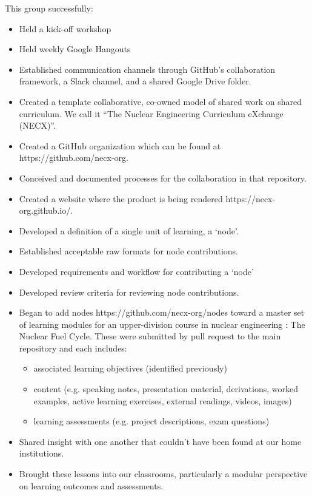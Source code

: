 \documentclass[11pt]{article}
\begin{document}
          This group successfully:
          \begin{itemize}
                  \item Held a kick-off workshop 
                  \item Held weekly Google Hangouts
                  \item Established communication channels through GitHub's 
                          collaboration framework, a Slack channel, and a 
                          shared Google Drive folder.
                  \item Created a template 
                          collaborative, co-owned model of shared work on 
                          shared curriculum. We call it ``The Nuclear 
                          Engineering Curriculum eXchange (NECX)''.
                  \item Created a GitHub organization which can be found
                          at https://github.com/necx-org. 
                  \item Conceived and documented processes for the collaboration in that repository.
                  \item Created a website where the product is being rendered https://necx-org.github.io/.
                  \item Developed a definition of a single unit of learning, a 
                          `node'.
                  \item Established acceptable raw formats for node 
                          contributions.
                  \item Developed requirements and workflow for contributing a `node'
                  \item Developed review criteria for reviewing node contributions.
                  \item Began to add nodes https://github.com/necx-org/nodes 
                          toward a master set of learning modules for an 
                          upper-division course in nuclear engineering : The 
                          Nuclear Fuel Cycle. These were submitted by pull 
                          request to the main repository and each includes:
          \begin{itemize} 
                  \item associated learning objectives (identified previously)
                \item content (e.g. speaking notes, presentation material, 
                        derivations, worked examples, active learning  
                          exercises, external readings, videos, images)
                  \item learning assessments (e.g. project descriptions, exam questions) 
          \end{itemize}
                  \item Shared insight with one another that couldn’t have been found at our home institutions.
                  \item Brought these lessons into our classrooms, particularly 
                          a modular perspective on learning outcomes and assessments.
          \end{itemize}
\end{document}
